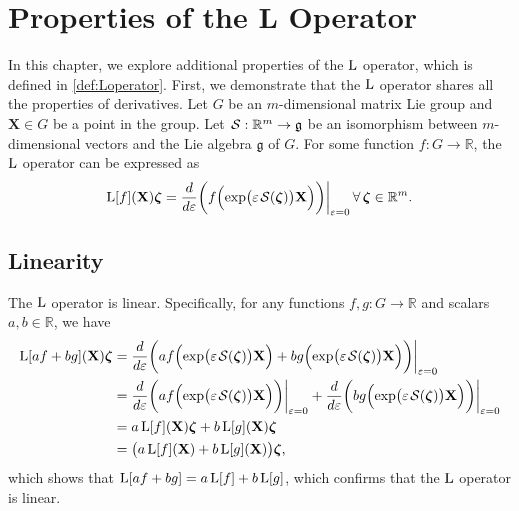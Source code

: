 \chapter{Properties of the L Operator}\label{app:properties-L-op}
In this chapter, we explore additional properties of the $\operatorname{L}$ operator, which is defined in \cref{def:Loperator}. First, we demonstrate that the $\operatorname{L}$ operator shares all the properties of derivatives. Let $G$ be an $m$-dimensional matrix Lie group and $\mathbf{X}\in G$ be a point in the group. Let $\SL:\mathbb{R}^m\to\mathfrak{g}$ be an isomorphism between $m$-dimensional vectors and the Lie algebra $\mathfrak{g}$ of $G$. For some function $f:G\to \mathbb{R}$, the $\operatorname{L}$ operator can be expressed as
\begin{align}
    \Lop[f](\mathbf{X})\boldsymbol{\zeta} = \frac{d}{d\varepsilon}\biggl(f\Bigl(\exp\bigl(\varepsilon\SL[\boldsymbol{\zeta}]\bigr)\mathbf{X}\Bigr)\biggr)\biggr|_{\varepsilon=0}\,\forall\,\boldsymbol{\zeta}\in\mathbb{R}^m. \label{eq:appendix-prop-Lop-definition-L}
\end{align}
\section{Linearity}
The $\operatorname{L}$ operator is linear. Specifically, for any functions $f,g:G\to \mathbb{R}$ and scalars $a,b\in\mathbb{R}$, we have
\begin{align}
    \begin{split}
        \Lop[a f + b g](\mathbf{X})\boldsymbol{\zeta} &= \frac{d}{d\varepsilon}\biggl(a f\Bigl(\exp\bigl(\varepsilon\SL[\boldsymbol{\zeta}]\bigr)\mathbf{X}\Bigr) + b g\Bigl(\exp\bigl(\varepsilon\SL[\boldsymbol{\zeta}]\bigr)\mathbf{X}\Bigr)\biggr)\biggr|_{\varepsilon=0}\\
        &= \frac{d}{d\varepsilon}\biggl(a f\Bigl(\exp\bigl(\varepsilon\SL[\boldsymbol{\zeta}]\bigr)\mathbf{X}\Bigr)\biggr)\biggr|_{\varepsilon=0} +  \frac{d}{d\varepsilon}\biggl(b g\Bigl(\exp\bigl(\varepsilon\SL[\boldsymbol{\zeta}]\bigr)\mathbf{X}\Bigr)\biggr)\biggr|_{\varepsilon=0}\\
        &= a \Lop[f](\mathbf{X})\boldsymbol{\zeta} + b \Lop[g](\mathbf{X})\boldsymbol{\zeta}\\
        &= \bigl(a \Lop[f](\mathbf{X}) + b \Lop[g](\mathbf{X})\bigr)\boldsymbol{\zeta},
    \end{split}
\end{align}
which shows that $\operatorname{L}[a f + b g] = a \operatorname{L}[f] + b \operatorname{L}[g]$, which confirms that the $\operatorname{L}$ operator is linear.
